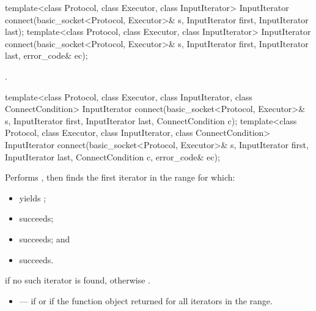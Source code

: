 \begin{itemdecl}
template<class Protocol, class Executor, class InputIterator>
  InputIterator connect(basic_socket<Protocol, Executor>& s,
                        InputIterator first, InputIterator last);
template<class Protocol, class Executor, class InputIterator>
  InputIterator connect(basic_socket<Protocol, Executor>& s,
                        InputIterator first, InputIterator last,
                        error_code& ec);
\end{itemdecl}

\begin{itemdescr}
\pnum
\returns {}.
\end{itemdescr}

\begin{itemdecl}
template<class Protocol, class Executor, class InputIterator, class ConnectCondition>
  InputIterator connect(basic_socket<Protocol, Executor>& s,
                        InputIterator first, InputIterator last,
                        ConnectCondition c);
template<class Protocol, class Executor, class InputIterator, class ConnectCondition>
  InputIterator connect(basic_socket<Protocol, Executor>& s,
                        InputIterator first, InputIterator last,
                        ConnectCondition c, error_code& ec);
\end{itemdecl}

\begin{itemdescr}
\pnum
\effects Performs , then finds the first iterator  in the range  for which:
\begin{itemize}
\item
{} yields ;
\item
{} succeeds;
\item
{} succeeds; and
\item
{} succeeds.
\end{itemize}

\pnum
\returns {} if no such iterator is found, otherwise .

\pnum
\errors
\begin{itemize}
\item
{} --- if  or if the function object  returned  for all iterators in the range.
\end{itemize}
\end{itemdescr}



